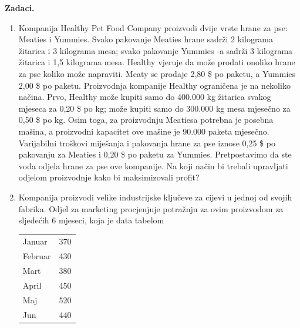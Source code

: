 \documentclass[a4paper, utf8, 11pt, colorlinks]{book}
\begin{document}
\textbf{\Large Zadaci.}
\begin{enumerate}
	\item  Kompanija Healthy Pet Food Company proizvodi dvije vrste hrane za pse: Meaties i Yummies. Svako pakovanje Meaties hrane sadrži 2 kilograma žitarica i 3 kilograma mesa; svako pakovanje Yummies -a sadrži 3 kilograma žitarica i 1,5 kilograma mesa. Healthy vjeruje da može prodati onoliko hrane za pse koliko može napraviti. Meaty se prodaje   2,80 \$ po paketu, a Yummies   2,00 \$ po paketu. Proizvodnja kompanije Healthy ograničena je na nekoliko načina. Prvo, Healthy može kupiti samo do 400.000 kg žitarica svakog mjeseca za 0,20 \$ po kg; može
	kupiti samo do 300.000 kg mesa mjesečno za 0,50 \$ po kg. Osim toga, za proizvodnju Meatiesa potrebna je posebna mašina, a proizvodni kapacitet ove mašine je 90.000 paketa mjesečno. Varijabilni troškovi miješanja i pakovanja hrane za pse iznose 0,25 \$ po pakovanju za Meaties i 0,20 \$ po paketu za Yummies.  
	Pretpostavimo da ste vođa odjela hrane za pse  ove kompanije. Na koji način bi trebali upravljati odjelom proizvodnje kako bi maksimizovali profit? 
	\item %
	 Kompanija proizvodi velike industrijske ključeve za cijevi u jednoj od svojih fabrika. Odjel za marketing procjenjuje potražnju za ovim proizvodom za sljedećih 6
	mjeseci, koja je data tabelom
 \begin{center}
    \begin{tabular}{lc}\hline
		 Januar  & 370 \\
		 Februar & 430 \\
		 Mart    & 380 \\
		 April   & 450 \\
		 Maj     & 520 \\
		 Jun     & 440 \\
		 \hline
	\end{tabular}  
\end{center}	
	

\end{enumerate}
\end{document}
